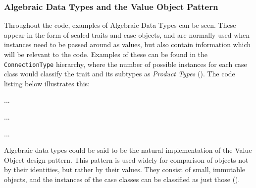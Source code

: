 \subsubsection{Algebraic Data Types and the Value Object Pattern} \label{sec:Implementation.ADTAndValueObject}
Throughout the code, examples of Algebraic Data Types can be seen. These appear
in the form of sealed traits and case objects, and are normally used when
instances need to be passed around as values, but also contain information which will
be relevant to the code. Examples of these can be found in the
\texttt{ConnectionType} hierarchy, where the number of possible instances for
each case class would classify the trait and its subtypes as \emph{Product
Types} (\cite[][p.~411]{wampler2015programming}). The code listing below
illustrates this:

{
  \small
  
}
...

{
  \small
  
}
...

{
  \small
  
}
...

Algebraic data types could be said to be the natural implementation of the
Value Object design pattern. This pattern is used widely for comparison of
objects not by their identities, but rather by their values. They consist of
small, immutable objects, and the instances of the case classes can be
classified as just those (\cite[][Ch.~8,~Location~3068]{nikolov2016scala}).
